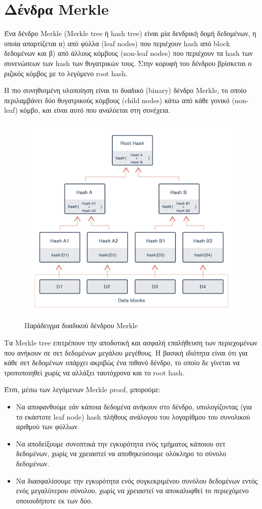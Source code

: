\section{Δένδρα Merkle} \label{section:2-3-merkle-trees}

Ένα δένδρο Merkle (Merkle tree ή hash tree) είναι μία δενδρική δομή δεδομένων, η οποία απαρτίζεται α) από φύλλα (leaf nodes) που περιέχουν hash από block δεδομένων και β) από άλλους κόμβους (non-leaf nodes) που περιέχουν τα hash των συνενώσεων των hash των θυγατρικών τους. Στην κορυφή του δένδρου βρίσκεται ο ριζικός κόμβος με το λεγόμενο root hash.

Η πιο συνηθισμένη υλοποίηση είναι το δυαδικό (binary) δένδρο Merkle, το οποίο περιλαμβάνει δύο θυγατρικούς κόμβους (child nodes) κάτω από κάθε γονικό (non-leaf) κόμβο, και είναι αυτό που αναλύεται στη συνέχεια.

\begin{figure}[H]
	\centering
	\includegraphics[width=.85\textwidth]{assets/figures/chapter-2/2.3.merkle-tree}
	\caption{Παράδειγμα δυαδικού δένδρου Merkle}
\end{figure}

Τα Merkle tree επιτρέπουν την αποδοτική και ασφαλή επαλήθευση των περιεχομένων που ανήκουν σε σετ δεδομένων μεγάλου μεγέθους. Η βασική ιδιότητα είναι ότι για κάθε σετ δεδομένων υπάρχει ακριβώς ένα πιθανό δένδρο, το οποίο δε γίνεται να τροποποιηθεί χωρίς να αλλάξει ταυτόχρονα και το root hash. 

Έτσι, μέσω των λεγόμενων Merkle proof, μπορούμε:
\begin{itemize}
	\item Να αποφανθούμε εάν κάποια δεδομένα ανήκουν στο δένδρο, υπολογίζοντας (για το εκάστοτε leaf node) hash πλήθους ανάλογου του λογαρίθμου του συνολικού αριθμού των φύλλων.
	\item Να αποδείξουμε συνοπτικά την εγκυρότητα ενός τμήματος κάποιου σετ δεδομένων, χωρίς να χρειαστεί να αποθηκεύσουμε ολόκληρο το σύνολο δεδομένων.
	\item Να διασφαλίσουμε την εγκυρότητα ενός συγκεκριμένου συνόλου δεδομένων εντός ενός μεγαλύτερου σύνολου, χωρίς να χρειαστεί να αποκαλυφθεί το περιεχόμενο οποιουδήποτε εκ των δύο.\cite{2.3-merkle-proofs-explained} 
\end{itemize}
